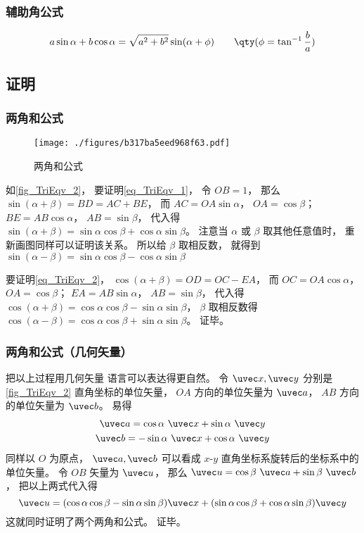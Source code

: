 \subsubsection{辅助角公式}
\begin{equation}
a\sin \alpha + b\cos \alpha = \sqrt{a^2+b^2}\sin(\alpha + \phi) \qquad \qty(\phi = \tan^{-1}\frac{b}{a})
\end{equation}

\subsection{证明}\label{sub_TriEqv_1}
\subsubsection{两角和公式}
\begin{figure}[ht]
\centering
\texttt{[image: ./figures/b317ba5eed968f63.pdf]}
\caption{两角和公式} \label{fig_TriEqv_2}
\end{figure}
如\autoref{fig_TriEqv_2}， 要证明\autoref{eq_TriEqv_1}， 令 $OB = 1$， 那么 $\sin(\alpha+\beta) = BD = AC + BE$， 而 $AC = OA \sin\alpha$， $OA = \cos\beta$； $BE = AB\cos\alpha$， $AB = \sin\beta$， 代入得 $\sin(\alpha+\beta) = \sin\alpha\cos\beta + \cos\alpha\sin\beta$。 注意当 $\alpha$ 或 $\beta$ 取其他任意值时， 重新画图同样可以证明该关系。 所以给 $\beta$ 取相反数， 就得到 $\sin(\alpha-\beta) = \sin\alpha\cos\beta - \cos\alpha\sin\beta$

要证明\autoref{eq_TriEqv_2}， $\cos(\alpha+\beta) = OD = OC - EA$， 而 $OC = OA\cos\alpha$， $OA = \cos\beta$； $EA = AB\sin\alpha$， $AB = \sin\beta$， 代入得 $\cos(\alpha+\beta) = \cos\alpha\cos\beta - \sin\alpha\sin\beta$， $\beta$ 取相反数得 $\cos(\alpha-\beta) = \cos\alpha\cos\beta + \sin\alpha\sin\beta$。 证毕。

\subsubsection{两角和公式（几何矢量）}
把以上过程用几何矢量 语言可以表达得更自然。 令 $\uvec x, \uvec y$ 分别是\autoref{fig_TriEqv_2} 直角坐标的单位矢量， $OA$ 方向的单位矢量为 $\uvec a$， $AB$ 方向的单位矢量为 $\uvec b$。 易得
\begin{gather}
\uvec a = \cos\alpha\ \uvec x + \sin\alpha\ \uvec y\\
\uvec b = -\sin\alpha\ \uvec x + \cos\alpha\ \uvec y
\end{gather}
同样以 $O$ 为原点， $\uvec a, \uvec b$ 可以看成 $x$-$y$ 直角坐标系旋转后的坐标系中的单位矢量。 令 $OB$ 矢量为 $\uvec u$， 那么 $\uvec u = \cos\beta\ \uvec a + \sin\beta\ \uvec b$， 把以上两式代入得
\begin{equation}
\uvec u = (\cos\alpha\cos\beta - \sin\alpha\sin\beta)\uvec x + (\sin\alpha\cos\beta + \cos\alpha\sin\beta)\uvec y
\end{equation}
这就同时证明了两个两角和公式。 证毕。

